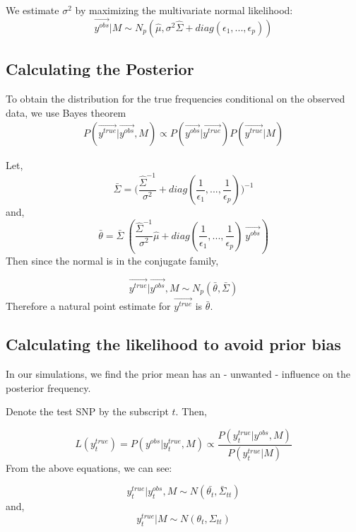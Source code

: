 \documentclass[10pt,a4paper,draft]{article}
\begin{document}
We estimate $\sigma^2$ by maximizing the multivariate normal likelihood:
\begin{equation}
 \vec{y^{obs}}|M \sim N_p(\hat{\mu}, \sigma^2\hat{\Sigma} + diag(\epsilon_1,...,\epsilon_p))
\end{equation}


\subsection{Calculating the Posterior}
To obtain the distribution for the true frequencies conditional on the observed data, we use Bayes theorem 
\begin{align*}
P(\vec{y^{true}} | \vec{y^{obs}}, M) \propto P(\vec{y^{obs}} | \vec{y^{true}}) P(\vec{y^{true}}|M)
\end{align*}

Let, 
\begin{equation} \label{barsigma}
\bar{\Sigma} = \big(\frac{\hat{\Sigma}^{-1}}{\sigma^2} + diag(\frac{1}{\epsilon_1},..., \frac{1}{\epsilon_p})\big)^{-1}
\end{equation}
and,
\begin{equation}
\bar{\theta} = \bar{\Sigma} \ (\frac{\hat{\Sigma}^{-1}}{\sigma^2}\hat{\mu} + diag(\frac{1}{\epsilon_1},..., \frac{1}{\epsilon_p}) \ \vec{y^{obs}})
\end{equation}
Then since the normal is in the conjugate family,

\begin{equation}
\vec{y^{true}} | \vec{y^{obs}}, M \sim N_p(\bar{\theta}, \bar{\Sigma})
\end{equation}
Therefore a natural point estimate for $\vec{y^{true}}$ is $\bar{\theta}$.

\subsection{Calculating the likelihood to avoid prior bias}
In our simulations, we find the prior mean has an - unwanted - influence on the posterior frequency.

Denote the test SNP by the subscript $t$. Then,

\begin{equation}
L(y_t^{true}) = P(y^{obs} | y_t^{true}, M) \propto \frac{P(y_t^{true}| y^{obs}, M)}{P(y_t^{true} | M)}
\end{equation}
From the above equations, we can see:

\begin{equation}
y_t^{true} | y_t^{obs}, M \sim N(\bar{\theta_t}, \bar{\Sigma}_{tt})
\end{equation}
and,
\begin{equation}
y_t^{true} | M \sim N(\theta_t, \Sigma_{tt})
\end{equation}
\end{document}
